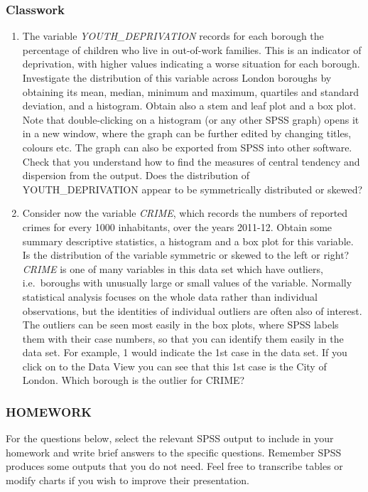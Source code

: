 \subsubsection{Classwork}

\begin{enumerate}
\item
The variable \emph{YOUTH\_DEPRIVATION} records for each borough the percentage
of children who live in out-of-work families. This is an indicator
of deprivation, with higher values indicating a worse situation for each borough. Investigate
the distribution of this variable across London boroughs by obtaining its mean, median,
minimum and maximum, quartiles and standard deviation, and a histogram. Obtain also a stem and leaf
plot and a box plot.
Note that double-clicking on a histogram (or any other SPSS graph) opens it in a
new window, where the graph can be further edited by changing titles,
colours etc. The graph can also be exported from SPSS into other software.
Check that you understand how to find the measures of central tendency and dispersion from the
output. Does the distribution of YOUTH\_DEPRIVATION appear to be symmetrically distributed or
skewed?
\item
Consider now the variable \emph{CRIME}, which records the numbers of
reported crimes for every 1000 inhabitants, over the years 2011-12. Obtain
some summary descriptive statistics, a histogram and a box plot for this variable.
Is the distribution of the variable symmetric or skewed to the
left or right?
\emph{CRIME} is one of many variables in this data set which have
outliers, i.e.\ boroughs with unusually large or small values of the variable.
Normally statistical analysis focuses on the
whole data rather than individual observations, but
the identities of individual outliers are often also of interest. The outliers
can be seen most easily in the box plots, where SPSS labels them with their
case numbers, so that you can identify them easily in the data set. For example, 1 would indicate
the 1st case in the data set. If you click on to the Data View you can see that
this 1st case is the City of London. Which borough is the outlier for CRIME?
\end{enumerate}

\subsubsection{HOMEWORK}
For the questions below, select the relevant SPSS output to include in
your homework and write brief answers to the specific questions.
Remember SPSS produces some outputs that you do not need. Feel free to
transcribe tables or modify charts if you wish to improve their
presentation.

